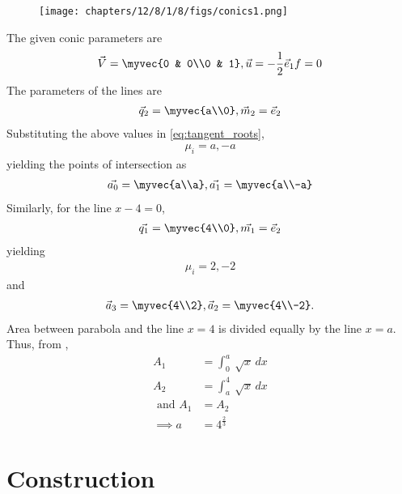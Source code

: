 	\begin{figure}[H]
		\centering
 \texttt{[image: chapters/12/8/1/8/figs/conics1.png]}
		\caption{}
		\label{fig:12/8/1/8}
  	\end{figure}
The given conic parameters are
\begin{align}
 \vec{V} = \myvec{0 & 0\\0 & 1},
	\vec{u} = -\frac{1}{2}\vec{e}_1
 f = 0
\end{align}
The parameters of the lines are
\begin{align}
\vec{q}_2=\myvec{a\\0},
\vec{m}_2=\vec{e}_2
\end{align}
Substituting the above values in 
\eqref{eq:tangent_roots},
\begin{align}
\mu_i=a,-a
\end{align}
yielding  the points of  intersection as
\begin{align}
\vec{a_0}=\myvec{a\\a},
\vec{a_1}=\myvec{a\\-a}
\end{align}
Similarly, for the line $x-4=0$, 
\begin{align}
\vec{q_1}=\myvec{4\\0},
\vec{m_1}=\vec{e}_2
\end{align}
yielding
\begin{align}
\mu_i=2,-2
\end{align}
and
\begin{align}
\vec{a}_3=\myvec{4\\2},
\vec{a}_2=\myvec{4\\-2}.
\end{align}
Area between parabola and the line $x=4$ is divided equally by the line $x=a$.  Thus, 
		from ,
\begin{align}
	A_1&=\int_{0}^{a} \ \sqrt{x} \,dx
	\\
	A_2&=\int_{a}^{4} \ \sqrt{x} \,dx
	\\
	\text{ and }
	A_1&=A_2 \\
\implies 
	a&=4^\frac{2}{3}
\end{align}

\iffalse
\section*{\large Construction}

